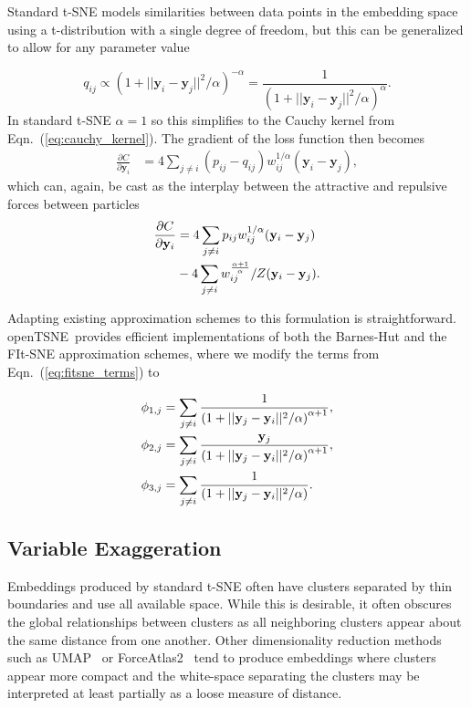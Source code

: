 \documentclass[letter]{article}
\newcommand{\opentsne}{\textsf{openTSNE}}
\begin{document}
Standard t-SNE models similarities between data points in the embedding space
using a t-distribution with a single degree of freedom, but this can be
generalized to allow for any parameter value

\begin{equation}
q_{ij} \propto \left ( 1 + || \mathbf{y}_i - \mathbf{y}_j ||^2 / \alpha \right )^{-\alpha} = \frac{1}{\left( 1 + || \mathbf{y}_i - \mathbf{y}_j ||^2 / \alpha \right)^\alpha }.
\end{equation}
In standard t-SNE $\alpha=1$ so this simplifies to the Cauchy kernel from
Eqn.~(\ref{eq:cauchy_kernel}). The gradient of the loss function then becomes
\begin{align}
\frac{\partial C}{\partial \mathbf{y}_i} &= 4 \sum_{j \neq i} \left ( p_{ij} - q_{ij} \right ) w_{ij}^{1/\alpha} \left ( \mathbf{y}_i - \mathbf{y}_j \right ),
\end{align}
which can, again, be cast as the interplay between the attractive and repulsive forces between particles
\begin{align}
\frac{\partial C}{\partial \mathbf{y}_i} &= 4 \sum_{j \neq i} p_{ij} w_{ij}^{1/\alpha} (\mathbf{y}_i - \mathbf{y}_j) \notag \\
&- 4 \sum_{j \neq i} w_{ij}^{\frac{\alpha+1}{\alpha}} / Z (\mathbf{y}_i - \mathbf{y}_j).
\end{align}

Adapting existing approximation schemes to this formulation is straightforward.
\opentsne\ provides efficient implementations of both the Barnes-Hut and the
FIt-SNE approximation schemes, where we modify the terms from
Eqn.~(\ref{eq:fitsne_terms}) to

\begin{align}
\phi_{1,j} &= \sum_{j \neq i} \frac{1}{\left( 1 + || \mathbf{y}_j - \mathbf{y}_i ||^2 / \alpha \right)^{\alpha+1}}, \notag \\
\phi_{2,j} &= \sum_{j \neq i} \frac{\mathbf{y}_j}{\left( 1 + || \mathbf{y}_j - \mathbf{y}_i ||^2 / \alpha \right)^{\alpha+1}}, \notag \\
\phi_{3,j} &= \sum_{j \neq i} \frac{1}{\left( 1 + || \mathbf{y}_j - \mathbf{y}_i ||^2 / \alpha \right)}. \notag
\end{align}

\subsection*{Variable Exaggeration}

Embeddings produced by standard t-SNE often have clusters separated by
thin boundaries and use all available space. While this is desirable,
it often obscures the global relationships between clusters as all
neighboring clusters appear about the same distance from one
another. Other dimensionality reduction methods such as
UMAP~\cite{2018arXivUMAP} or ForceAtlas2~\cite{jacomy2014forceatlas2}
tend to produce embeddings where clusters appear more compact and the
white-space separating the clusters may be interpreted at least
partially as a loose measure of distance.
\end{document}
